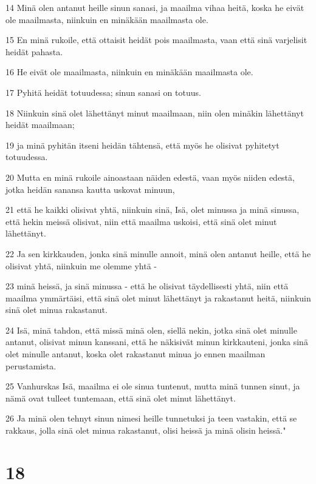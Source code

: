 \par 14 Minä olen antanut heille sinun sanasi, ja maailma vihaa heitä, koska he eivät ole maailmasta, niinkuin en minäkään maailmasta ole.
\par 15 En minä rukoile, että ottaisit heidät pois maailmasta, vaan että sinä varjelisit heidät pahasta.
\par 16 He eivät ole maailmasta, niinkuin en minäkään maailmasta ole.
\par 17 Pyhitä heidät totuudessa; sinun sanasi on totuus.
\par 18 Niinkuin sinä olet lähettänyt minut maailmaan, niin olen minäkin lähettänyt heidät maailmaan;
\par 19 ja minä pyhitän itseni heidän tähtensä, että myös he olisivat pyhitetyt totuudessa.
\par 20 Mutta en minä rukoile ainoastaan näiden edestä, vaan myös niiden edestä, jotka heidän sanansa kautta uskovat minuun,
\par 21 että he kaikki olisivat yhtä, niinkuin sinä, Isä, olet minussa ja minä sinussa, että hekin meissä olisivat, niin että maailma uskoisi, että sinä olet minut lähettänyt.
\par 22 Ja sen kirkkauden, jonka sinä minulle annoit, minä olen antanut heille, että he olisivat yhtä, niinkuin me olemme yhtä -
\par 23 minä heissä, ja sinä minussa - että he olisivat täydellisesti yhtä, niin että maailma ymmärtäisi, että sinä olet minut lähettänyt ja rakastanut heitä, niinkuin sinä olet minua rakastanut.
\par 24 Isä, minä tahdon, että missä minä olen, siellä nekin, jotka sinä olet minulle antanut, olisivat minun kanssani, että he näkisivät minun kirkkauteni, jonka sinä olet minulle antanut, koska olet rakastanut minua jo ennen maailman perustamista.
\par 25 Vanhurskas Isä, maailma ei ole sinua tuntenut, mutta minä tunnen sinut, ja nämä ovat tulleet tuntemaan, että sinä olet minut lähettänyt.
\par 26 Ja minä olen tehnyt sinun nimesi heille tunnetuksi ja teen vastakin, että se rakkaus, jolla sinä olet minua rakastanut, olisi heissä ja minä olisin heissä."

\chapter{18}

